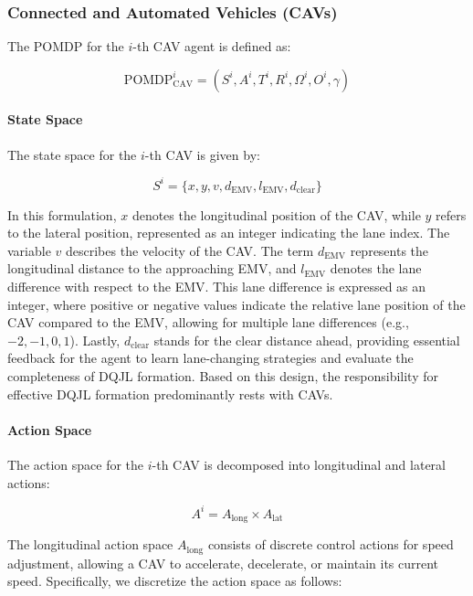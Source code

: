 \subsubsection{Connected and Automated Vehicles (CAVs)}
The POMDP for the \(i\)-th CAV agent is defined as:

\begin{equation}
\text{POMDP}_{\text{CAV}}^i = \left( S^i, A^i, T^i, R^i, \Omega^i, O^i, \gamma \right)
\end{equation}

\paragraph{State Space}
The state space for the \(i\)-th CAV is given by:

\begin{equation}
S^i = \{x, y, v, d_\text{EMV}, l_\text{EMV}, d_\text{clear}\}
\end{equation}

In this formulation, \(x\) denotes the longitudinal position of the CAV, while \(y\) refers to the lateral position, represented as an integer indicating the lane index. The variable \(v\) describes the velocity of the CAV. The term \(d_\text{EMV}\) represents the longitudinal distance to the approaching EMV, and \(l_\text{EMV}\) denotes the lane difference with respect to the EMV. This lane difference is expressed as an integer, where positive or negative values indicate the relative lane position of the CAV compared to the EMV, allowing for multiple lane differences (e.g., \(-2, -1, 0, 1\)). Lastly, \(d_\text{clear}\) stands for the clear distance ahead, providing essential feedback for the agent to learn lane-changing strategies and evaluate the completeness of DQJL formation. Based on this design, the responsibility for effective DQJL formation predominantly rests with CAVs.

\paragraph{Action Space}
The action space for the \(i\)-th CAV is decomposed into longitudinal and lateral actions:

\begin{equation}
A^i = A_{\text{long}} \times A_{\text{lat}}
\end{equation}

The longitudinal action space \( A_{\text{long}} \) consists of discrete control actions for speed adjustment, allowing a CAV to accelerate, decelerate, or maintain its current speed. Specifically, we discretize the action space as follows:

